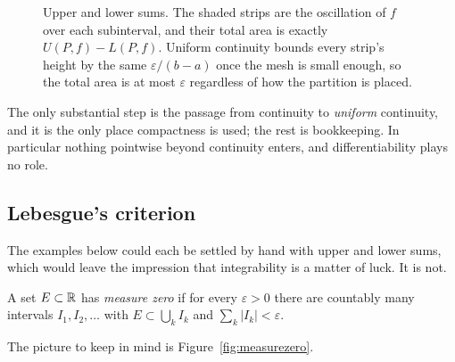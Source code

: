 \begin{figure}[htbp]
\centering
{}
\caption{Upper and lower sums. The shaded strips are the oscillation of $f$
over each subinterval, and their total area is exactly $U(P,f)-L(P,f)$.
Uniform continuity bounds every strip's height by the same
$\varepsilon/(b-a)$ once the mesh is small enough, so the total area is at
most $\varepsilon$ regardless of how the partition is placed.}
\label{fig:sums}
\end{figure}

The only substantial step is the passage from continuity to \emph{uniform}
continuity, and it is the only place compactness is used; the rest is
bookkeeping. In particular nothing pointwise beyond continuity enters, and
differentiability plays no role.

\subsection{Lebesgue's criterion}

The examples below could each be settled by hand with upper and lower sums,
which would leave the impression that integrability is a matter of luck. It
is not.

\begin{definition}
A set $E \subset \mathbb{R}$ has \emph{measure zero} if for every $\varepsilon>0$
there are countably many intervals $I_1,I_2,\dots$ with
$E \subset \bigcup_k I_k$ and $\sum_k |I_k| < \varepsilon$.
\end{definition}

The picture to keep in mind is Figure~\ref{fig:measurezero}.

